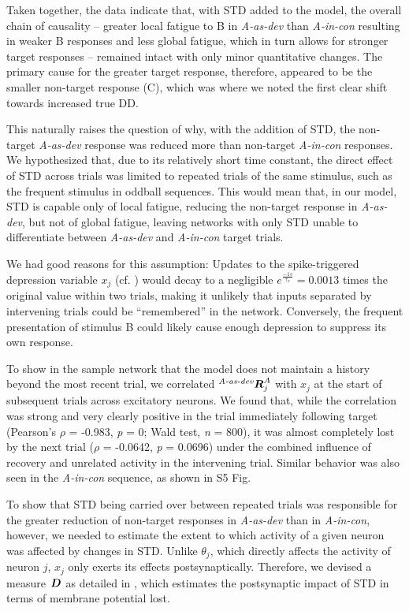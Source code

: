 \documentclass[9pt,lineno,onehalfspacing]{elife}
\newcommand{\dev}{\textit{A-as-dev}}
\newcommand{\msc}{\textit{A-in-con}}
\newcommand{\std}{\textit{A-as-std}}
\newcommand{\ifstringequal}[4]{%
  \ifnum\pdfstrcmp{#1}{#2}=0
  #3%
  \else
  #4%
  \fi
}
\newcommand{\seqreplace}[1]{\ifstringequal{dev}{#1}{\dev}{%
    \ifstringequal{std}{#1}{\std}{%
        \ifstringequal{msc}{#1}{\msc}{#1}%
    }%
}}
\newcommand{\R}[3][]{{}^{\seqreplace{#1}}_{}\boldsymbol R^{#2}_{#3}}
\newcommand{\D}[3][]{{}^{\seqreplace{#1}}_{}\boldsymbol D^{#2}_{#3}}
\begin{document}
Taken together, the data indicate that, with STD added to the model, the overall chain of causality -- greater local fatigue to B in \dev{} than \msc{} resulting in weaker B responses and less global fatigue, which in turn allows for stronger target responses -- remained intact with only minor quantitative changes. The primary cause for the greater target response, therefore, appeared to be the smaller non-target response (C), which was where we noted the first clear shift towards increased true DD.

This naturally raises the question of why, with the addition of STD, the non-target \dev{} response was reduced more than non-target \msc{} responses. We hypothesized that, due to its relatively short time constant, the direct effect of STD across trials was limited to repeated trials of the same stimulus, such as the frequent stimulus in oddball sequences. This would mean that, in our model, STD is capable only of local fatigue, reducing the non-target response in \dev{}, but not of global fatigue, leaving networks with only STD unable to differentiate between \dev{} and \msc{} target trials.

We had good reasons for this assumption: Updates to the spike-triggered depression variable $x_j$ (cf. ) would decay to a negligible $e^\frac{-1 s}{\tau_x} = 0.0013$ times the original value within two trials, making it unlikely that inputs separated by intervening trials could be ``remembered'' in the network. Conversely, the frequent presentation of stimulus B could likely cause enough depression to suppress its own response.

To show in the sample network that the model does not maintain a history beyond the most recent trial, we correlated $\R[dev]{A}{j}$ with $x_j$ at the start of subsequent trials across excitatory neurons. We found that, while the correlation was strong and very clearly positive in the trial immediately following target (Pearson's $\rho$ = -0.983, \textit{p} = 0; Wald test, \textit{n} = 800), it was almost completely lost by the next trial ($\rho$ = -0.0642, \textit{p} = 0.0696) under the combined influence of recovery and unrelated activity in the intervening trial. Similar behavior was also seen in the \msc{} sequence, as shown in S5 Fig.

To show that STD being carried over between repeated trials was responsible for the greater reduction of non-target responses in \dev{} than in \msc{}, however, we needed to estimate the extent to which activity of a given neuron was affected by changes in STD. Unlike $\theta_j$, which directly affects the activity of neuron $j$, $x_j$ only exerts its effects postsynaptically. Therefore, we devised a measure $\D{}{}$ as detailed in , which estimates the postsynaptic impact of STD in terms of membrane potential lost.
\end{document}
